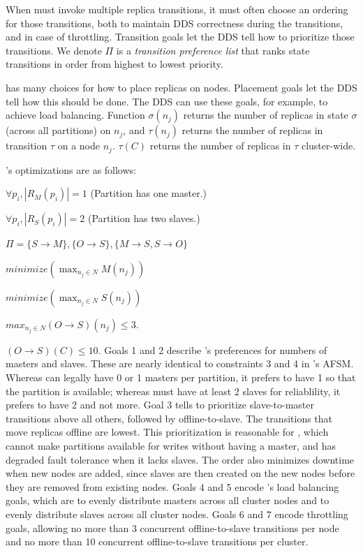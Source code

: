 When \helix must invoke
multiple replica transitions, it must often choose an ordering for those
transitions, both to maintain DDS correctness during the transitions, and in
case of throttling.  Transition goals let the DDS
tell \helix how to prioritize those transitions. 
We denote $\Pi$ is a \emph{transition preference list} that ranks
state transitions in order from highest to lowest priority.  

\helix has many choices for how to place replicas on nodes.  Placement goals let
the DDS tell \helix how this should be done.  The DDS can use these
goals, for example, to achieve load balancing.  
Function $\sigma(n_j)$ returns the number of replicas in state $\sigma$
(across all partitions) on $n_j$, and $\tau(n_j)$ returns the number of
replicas in transition $\tau$ on a node $n_j$.  $\tau(C)$ returns the number of
replicas in $\tau$ cluster-wide.  


\ES's optimizations are as follows:  
\be
\item $\forall p_i, |R_M(p_i)| = 1$  (Partition has one
master.)
\item $\forall p_i, |R_S(p_i)| = 2$  (Partition has two slaves.)   
\item $\Pi=\{S \rightarrow M\}, \{O \rightarrow S\}, \{M \rightarrow S, S
\rightarrow O\}$
\item $minimize(\max_{{n_j} \in N}M(n_j))$
\item $minimize(\max_{{n_j} \in N}S(n_j))$
\item $max_{{n_j} \in N}(O \rightarrow S)(n_j) \le 3$.
\item $(O \rightarrow S)(C) \le 10$.
\ee
Goals 1 and 2 describe \ES's preferences for numbers of masters and
slaves.  These are nearly identical to constraints 3 and 4 in \ES's AFSM.
Whereas \ES can legally have 0 or 1 masters per partition, it prefers to have 1
so that the partition is available; whereas \ES must have at least 2 slaves for
reliablility, it prefers to have 2 and not more.
Goal 3 tells \helix to prioritize slave-to-master transitions above all
others, followed by offline-to-slave.  The transitions that move replicas
offline are lowest.  This prioritization is reasonable for \ES, which cannot
make partitions available for writes without having a master, and has degraded 
fault tolerance when it lacks slaves.  The order also minimizes downtime when new nodes
are added, since slaves are then created on the new nodes before they are removed
from existing nodes. 
Goals 4 and 5 encode \ES's load
balancing goals, which are to evenly distribute masters across all cluster nodes
and to evenly distribute slaves across all cluster nodes.  Goals 6 and 7 encode
throttling goals, allowing no more than 3 concurrent offline-to-slave transitions per node
and no more than 10 concurrent offline-to-slave transitions per cluster.


